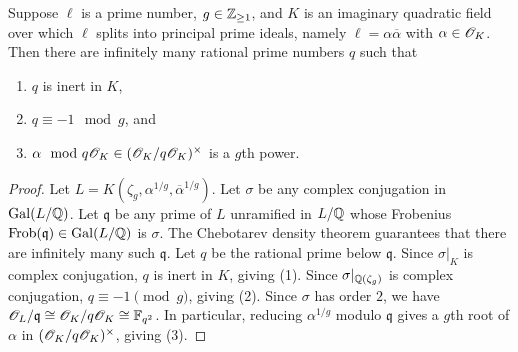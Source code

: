 \documentclass{amsart}
\begin{document}
\begin{lemma}\label{lem:K-exists}
  Suppose $\ell$ is a prime number, %
  $g \in\mathbb{Z}_{\ge 1}$, and $K$ is an imaginary quadratic field over which $\ell$ splits into principal prime ideals, namely $\ell = \alpha\overline{\alpha}$ with $\alpha\in \mathscr{O}_K$.
Then there are infinitely many rational prime numbers $q$ such that
    \begin{enumerate}
      \item $q$ is inert in $K$,
      \item $q \equiv -1 \mod{g}$, and
      \item $\alpha \mod q\mathscr{O}_K \in (\mathscr{O}_K/q\mathscr{O}_K)^\times$ is a $g$th power.
    \end{enumerate}
\end{lemma}
\begin{proof}
  Let $L = K(\zeta_g,\alpha^{1/g},\overline{\alpha}^{1/g})$.
  Let $\sigma$ be any complex conjugation in $\operatorname{Gal}(L/\mathbb{Q})$.
  Let $\mathfrak{q}$ be any prime of $L$ unramified in $L/\mathbb{Q}$ whose Frobenius $\mathrm{Frob}(\mathfrak{q}) \in \operatorname{Gal}(L/\mathbb{Q})$ is $\sigma$. The Chebotarev density theorem guarantees that there are infinitely many such $\mathfrak{q}$.
  Let $q$ be the rational prime below $\mathfrak{q}$.
  Since $\sigma|_K$ is complex conjugation, $q$ is inert in $K$, giving (1).
  Since $\sigma|_{\mathbb{Q}(\zeta_g)}$ is complex conjugation, $q \equiv -1 \pmod{g}$, giving (2).
Since $\sigma$ has order $2$, we have $\mathscr{O}_L/\mathfrak{q} \cong \mathscr{O}_K/q\mathscr{O}_K \cong \mathbb{F}_{q^2}$. In particular, reducing $\alpha^{1/g}$
modulo ${\mathfrak q}$ gives a $g$th root of $\alpha$
 in $(\mathscr{O}_K/q\mathscr{O}_K)^\times$, giving (3).
\end{proof}
\end{document}
